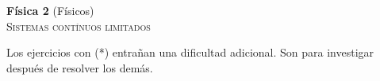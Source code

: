 \documentclass[11pt,spanish,a4paper]{article}
\begin{document}
\begin{center}
\textbf{Física 2} (Físicos) \hfill {}\\
	\textsc{\LARGE Sistemas contínuos limitados}
\end{center}


Los ejercicios con (*) entrañan una dificultad adicional. Son para investigar después de resolver los demás.


\begin{enumerate}






\end{enumerate}
\end{document}
